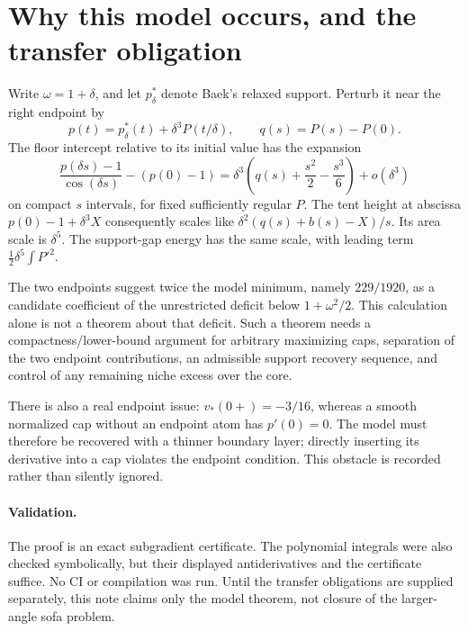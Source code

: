 \documentclass[11pt]{article}
\begin{document}
\section*{Why this model occurs, and the transfer obligation}
Write $\omega=1+\delta$, and let $p_\delta^*$ denote Baek's relaxed support. Perturb it near the right endpoint by
\[
 p(t)=p_\delta^*(t)+\delta^3P(t/\delta),\qquad q(s)=P(s)-P(0).
\]
The floor intercept relative to its initial value has the expansion
\[
 \frac{p(\delta s)-1}{\cos(\delta s)}-(p(0)-1)
 =\delta^3\left(q(s)+\frac{s^2}{2}-\frac{s^3}{6}\right)+o(\delta^3)
\]
on compact $s$ intervals, for fixed sufficiently regular $P$. The tent height at abscissa $p(0)-1+\delta^3X$ consequently scales like $\delta^2(q(s)+b(s)-X)/s$. Its area scale is $\delta^5$. The support-gap energy has the same scale, with leading term $\tfrac12\delta^5\int P'^2$.

The two endpoints suggest twice the model minimum, namely $229/1920$, as a candidate coefficient of the unrestricted deficit below $1+\omega^2/2$. This calculation alone is not a theorem about that deficit. Such a theorem needs a compactness/lower-bound argument for arbitrary maximizing caps, separation of the two endpoint contributions, an admissible support recovery sequence, and control of any remaining niche excess over the core.

There is also a real endpoint issue: $v_*(0+)=-3/16$, whereas a smooth normalized cap without an endpoint atom has $p'(0)=0$. The model must therefore be recovered with a thinner boundary layer; directly inserting its derivative into a cap violates the endpoint condition. This obstacle is recorded rather than silently ignored.

\paragraph{Validation.}
The proof is an exact subgradient certificate. The polynomial integrals were also checked symbolically, but their displayed antiderivatives and the certificate suffice. No CI or compilation was run. Until the transfer obligations are supplied separately, this note claims only the model theorem, not closure of the larger-angle sofa problem.
\end{document}
